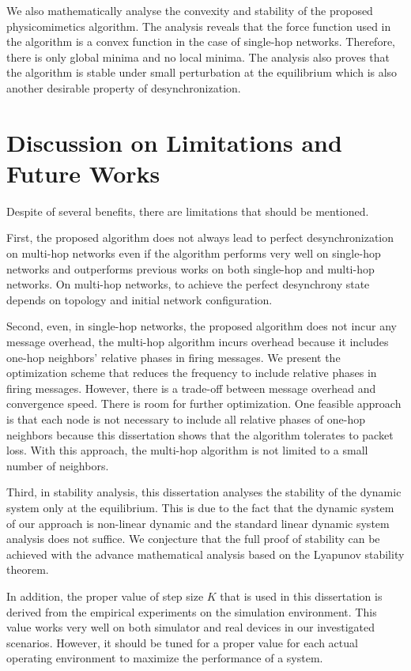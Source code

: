 We also mathematically analyse the convexity and stability of the proposed physicomimetics algorithm. The analysis reveals that the force function used in the algorithm is a convex function in the case of single-hop networks. Therefore, there is only global minima and no local minima. The analysis also proves that the algorithm is stable under small perturbation at the equilibrium which is also another desirable property of desynchronization.
 
\section{Discussion on Limitations and Future Works}
Despite of several benefits, there are limitations that should be mentioned. 

First, the proposed algorithm does not always lead to perfect desynchronization on multi-hop networks even if the algorithm performs very well on single-hop networks and outperforms previous works on both single-hop and multi-hop networks. On multi-hop networks, to achieve the perfect desynchrony state depends on topology and initial network configuration. 

Second, even, in single-hop networks, the proposed algorithm does not incur any message overhead, the multi-hop algorithm incurs overhead because it includes one-hop neighbors' relative phases in firing messages. 
We present the optimization scheme that reduces the frequency to include relative phases in firing messages. However, there is a trade-off between message overhead and convergence speed. There is room for further optimization. One feasible approach is that each node is not necessary to include all relative phases of one-hop neighbors because this dissertation shows that the algorithm tolerates to packet loss. With this approach, the multi-hop algorithm is not limited to a small number of neighbors.

Third, in stability analysis, this dissertation analyses the stability of the dynamic system only at the equilibrium. This is due to the fact that the dynamic system of our approach is non-linear dynamic and the standard linear dynamic system analysis does not suffice. We conjecture that the full proof of stability can be achieved with the advance mathematical analysis based on the Lyapunov stability theorem.

In addition, the proper value of step size $K$ that is used in this dissertation is derived from the empirical experiments on the simulation environment. This value works very well on both simulator and real devices in our investigated scenarios. However, it should be tuned for a proper value for each actual operating environment to maximize the performance of a system. 

